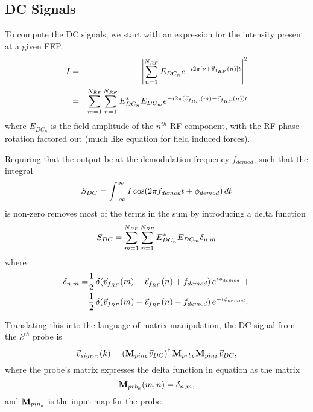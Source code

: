 \documentclass[12pt]{article}
\begin{document}
\subsection{DC Signals}
To compute the DC signals, we start with an expression for the intensity present at a given FEP,
\begin{eqnarray}
I &=& \left| \sum^{\Nrf}_{n = 1} E_{DC_n} e^{-i 2 \pi [\nu + \vFrf(n)] t}  \right|^2 \\
 &=& \sum^{\Nrf}_{m = 1} \sum^{\Nrf}_{n = 1}
 E^*_{DC_n} E_{DC_m} e^{-i 2 \pi (\vFrf(m) - \vFrf(n)) t}
\elabel{intensity}
\end{eqnarray}
where $E_{DC_n}$ is the field amplitude of the $n^{th}$ RF component, with the RF phase rotation factored out (much like equation  for field induced forces).

Requiring that the output be at the demodulation frequency $f_{demod}$, such that the integral
\begin{equation}
S_{DC} = \int^{\infty}_{-\infty} I \cos\!\left( {2 \pi f_{demod} t + \phi_{demod}} \right) dt
\end{equation}
is non-zero removes most of the terms in the sum by introducing a delta function
\begin{equation}
S_{DC} = \sum^{\Nrf}_{m = 1} \sum^{\Nrf}_{n = 1}
 E^*_{DC_n} E_{DC_m} \delta_{n,m}
\elabel{sigDC}
\end{equation}
where
\begin{align*}
\delta_{n,m} =
& \frac{1}{2} \,{\delta}\!\left( {\vec{v}_{f_{RF}}(m) - \vec{v}_{f_{RF}}(n) + f_{demod}} \right) e^{ i \phi_{demod}} ~ + \\
& \frac{1}{2} \,{\delta}\!\left( {\vec{v}_{f_{RF}}(m) - \vec{v}_{f_{RF}}(n) - f_{demod}} \right) e^{-i \phi_{demod}}.
\end{align*}

Translating this into the language of matrix manipulation, the DC signal from the $k^{th}$ probe is
\begin{equation}
\vec{v}_{sig_{DC}}(k) = \left( \mathbf{M}_{pin_{k}} \vec{v}_{DC} \right) ^\dagger \mathbf{M}_{prb_{k}} \mathbf{M}_{pin_{k}} \vec{v}_{DC},
\end{equation}
where the probe's matrix expresses the delta function in equation  as the matrix
\begin{equation}
\mathbf{M}_{prb_{k}}(m,n) = \delta_{n,m} ,
\end{equation}
and $\mathbf{M}_{pin_{k}}$ is the input map for the probe.
\end{document}

